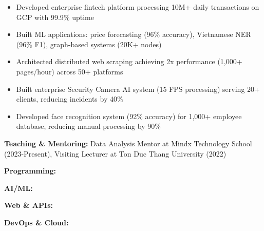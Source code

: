 \documentclass[10pt,a4paper,ragged2e,withhyper]{altacv}
\begin{document}
\smallskip

\begin{itemize}[leftmargin=*,noitemsep,topsep=0pt]
    \item Developed enterprise fintech platform processing 10M+ daily transactions on GCP with 99.9\% uptime
    \item Built ML applications: price forecasting (96\% accuracy), Vietnamese NER (96\% F1), graph-based systems (20K+ nodes)
    \item Architected distributed web scraping achieving 2x performance (1,000+ pages/hour) across 50+ platforms
\end{itemize}

\smallskip

\begin{itemize}[leftmargin=*,noitemsep,topsep=0pt]
    \item Built enterprise Security Camera AI system (15 FPS processing) serving 20+ clients, reducing incidents by 40\%
    \item Developed face recognition system (92\% accuracy) for 1,000+ employee database, reducing manual processing by 90\%
\end{itemize}

\smallskip

\textbf{Teaching \& Mentoring:} Data Analysis Mentor at Mindx Technology School (2023-Present), Visiting Lecturer at Ton Duc Thang University (2022)



\textbf{Programming:}       

\smallskip
\textbf{AI/ML:}        

\smallskip
\textbf{Web \& APIs:}       

\smallskip
\textbf{DevOps \& Cloud:}      
\end{document}
